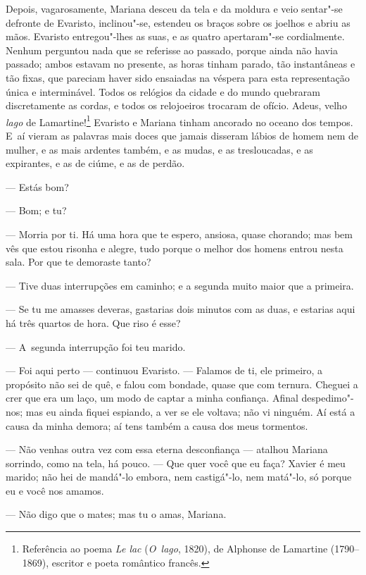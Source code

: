 \begin{linenumbers}
Depois, vagarosamente, Mariana desceu da tela e da moldura e veio
sentar"-se defronte de Evaristo, inclinou"-se, estendeu os braços sobre os
joelhos e abriu as mãos. Evaristo entregou"-lhes as suas, e as quatro
apertaram"-se cordialmente. Nenhum perguntou nada que se referisse ao
passado, porque ainda não havia passado; ambos estavam no presente, as
horas tinham parado, tão instantâneas e tão fixas, que pareciam haver
sido ensaiadas na véspera para esta representação única e interminável.
Todos os relógios da cidade e do mundo quebraram discretamente as
cordas, e todos os relojoeiros trocaram de ofício. Adeus, velho
\emph{lago} de Lamartine!\footnote{Referência ao poema \emph{Le lac}
  (\emph{O~lago}, 1820), de Alphonse de Lamartine (1790--1869), escritor
  e poeta romântico francês.} Evaristo e Mariana tinham ancorado no
oceano dos tempos. E~aí vieram as palavras mais doces que jamais
disseram lábios de homem nem de mulher, e as mais ardentes também, e as
mudas, e as tresloucadas, e as expirantes, e as de ciúme, e as de
perdão.

--- Estás bom?

--- Bom; e tu?

--- Morria por ti. Há uma hora que te espero, ansiosa, quase chorando;
mas bem vês que estou risonha e alegre, tudo porque o melhor dos homens
entrou nesta sala. Por que te demoraste tanto?

--- Tive duas interrupções em caminho; e a segunda muito maior que a
primeira.

--- Se tu me amasses deveras, gastarias dois minutos com as duas, e
estarias aqui há três quartos de hora. Que riso é esse?

--- A~segunda interrupção foi teu marido.

--- Foi aqui perto --- continuou Evaristo. --- Falamos de ti, ele primeiro,
a propósito não sei de quê, e falou com bondade, quase que com ternura.
Cheguei a crer que era um laço, um modo de captar a minha confiança.
Afinal despedimo"-nos; mas eu ainda fiquei espiando, a ver se ele
voltava; não vi ninguém. Aí está a causa da minha demora; aí tens também
a causa dos meus tormentos.

--- Não venhas outra vez com essa eterna desconfiança --- atalhou Mariana
sorrindo, como na tela, há pouco. --- Que quer você que eu faça? Xavier é
meu marido; não hei de mandá"-lo embora, nem castigá"-lo, nem matá"-lo, só
porque eu e você nos amamos.

--- Não digo que o mates; mas tu o amas, Mariana.


\end{linenumbers}
